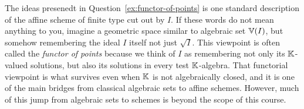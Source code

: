 \documentclass[12pt,reqno]{amsart}
\begin{document}
\hrulefill

The ideas presenedt in Question~\ref{ex:functor-of-points} is one standard description of the affine scheme of finite type cut out by $I$. If these words do not mean anything to you, imagine a geometric space similar to algebraic set $\mathbb{V}(I)$, but somehow remembering the ideal $I$ itself not just $\sqrt{I}$. This viewpoint is often called the \emph{functor of points} because we think of $I$ as remembering not only its $\mathbb{K}$-valued solutions, but also its solutions in every test $\mathbb{K}$-algebra. That functorial viewpoint is what survives even when $\mathbb{K}$ is not algebraically closed, and it is one of the main bridges from classical algebraic sets to affine schemes. However, much of this jump from algebraic sets to schemes is beyond the scope of this course. 
\end{document}

